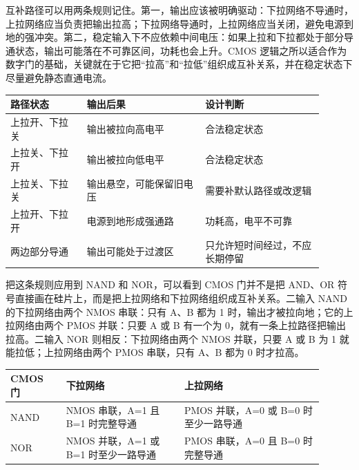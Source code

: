 互补路径可以用两条规则记住。第一，输出应该被明确驱动：下拉网络不导通时，上拉网络应当负责把输出拉高；下拉网络导通时，上拉网络应当关闭，避免电源到地的强冲突。第二，稳定输入下不应依赖中间电压：如果上拉和下拉都处于部分导通状态，输出可能落在不可靠区间，功耗也会上升。CMOS 逻辑之所以适合作为数字门的基础，关键就在于它把“拉高”和“拉低”组织成互补关系，并在稳定状态下尽量避免静态直通电流。

\begin{longtable}{L{0.22\linewidth}L{0.34\linewidth}L{0.34\linewidth}}
\toprule
路径状态 & 输出后果 & 设计判断 \\
\midrule
上拉开、下拉关 & 输出被拉向高电平 & 合法稳定状态 \\\tablerowrule
上拉关、下拉开 & 输出被拉向低电平 & 合法稳定状态 \\\tablerowrule
上拉关、下拉关 & 输出悬空，可能保留旧电压 & 需要补默认路径或改逻辑 \\\tablerowrule
上拉开、下拉开 & 电源到地形成强通路 & 功耗高，电平不可靠 \\\tablerowrule
两边部分导通 & 输出可能处于过渡区 & 只允许短时间经过，不应长期停留 \\
\bottomrule
\end{longtable}

把这条规则应用到 NAND 和 NOR，可以看到 CMOS 门并不是把 AND、OR 符号直接画在硅片上，而是把上拉网络和下拉网络组织成互补关系。二输入 NAND 的下拉网络由两个 NMOS 串联：只有 A、B 都为 1 时，输出才被拉向地；它的上拉网络由两个 PMOS 并联：只要 A 或 B 有一个为 0，就有一条上拉路径把输出拉高。二输入 NOR 则相反：下拉网络由两个 NMOS 并联，只要 A 或 B 为 1 就能拉低；上拉网络由两个 PMOS 串联，只有 A、B 都为 0 时才拉高。

\begin{longtable}{L{0.16\linewidth}L{0.34\linewidth}L{0.4\linewidth}}
\toprule
CMOS 门 & 下拉网络 & 上拉网络 \\
\midrule
NAND & NMOS 串联，A=1 且 B=1 时完整导通 & PMOS 并联，A=0 或 B=0 时至少一路导通 \\\tablerowrule
NOR & NMOS 并联，A=1 或 B=1 时至少一路导通 & PMOS 串联，A=0 且 B=0 时完整导通 \\
\bottomrule
\end{longtable}

